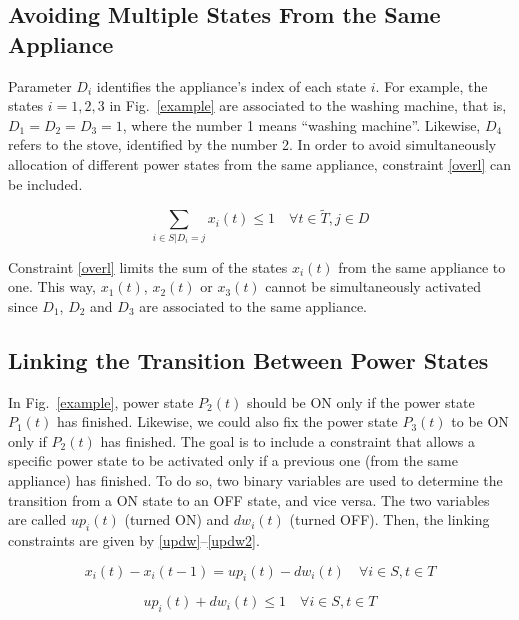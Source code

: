 \subsection{Avoiding Multiple States From the Same Appliance}

Parameter $D_i$ identifies the appliance's index of each state $i$. For example, the states $i = 1, 2, 3$ in Fig.~\ref{example} are associated to the washing machine, that is, $D_1 = D_2 = D_3 = 1$, where the number 1 means ``washing machine''. Likewise, $D_4$ refers to the stove, identified by the number 2. In order to avoid simultaneously allocation of different power states from the same appliance, constraint \eqref{overl} can be included.

\begin{equation} \label{overl}
   \sum_{i \in S | D_{i} = j} x_i(t) \leq 1 \quad \forall t \in \tilde{T}, j \in D
\end{equation}

Constraint \eqref{overl} limits the sum of the states $x_i(t)$ from the same appliance to one. This way, $x_1(t)$, $x_2(t)$ or $x_3(t)$ cannot be simultaneously activated since $D_1$, $D_2$ and $D_3$ are associated to the same appliance.

\subsection{Linking the Transition Between Power States}

In Fig.~\ref{example}, power state $P_2(t)$ should be ON only if the power state $P_1(t)$ has finished. Likewise, we could also fix the power state $P_3(t)$ to be ON only if $P_2(t)$ has finished. The goal is to include a constraint that allows a specific power state to be activated only if a previous one (from the same appliance) has finished. To do so, two binary variables are used to determine the transition from a ON state to an OFF state, and vice versa. The two variables are called $up_i(t)$ (turned ON) and $dw_i(t)$ (turned OFF). Then, the linking constraints are given by \eqref{updw}--\eqref{updw2}.
%

\begin{equation} \label{updw}
    x_i(t) - x_i(t-1) = up_i(t) - dw_i(t) \quad \forall i \in S, t \in T
\end{equation}


\begin{equation} \label{updw2}
    up_i(t) + dw_i(t) \leq 1 \quad \forall i \in S, t \in T
\end{equation}

